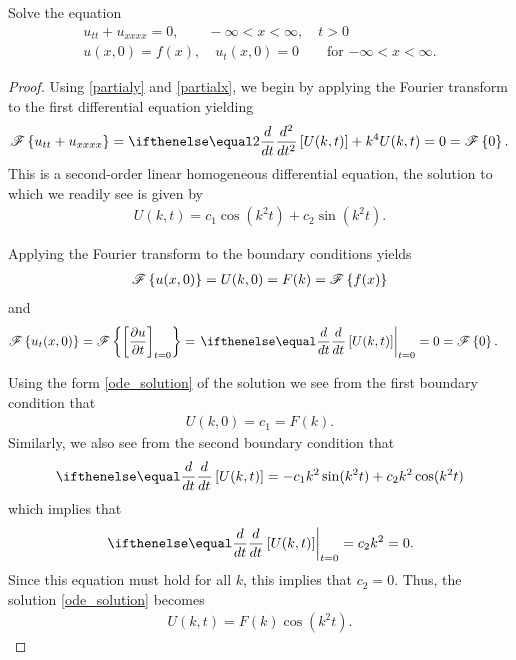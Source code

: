 \begin{problem}{2.12}
  Solve the equation
  \begin{align*}
    u_{tt} + u_{xxxx} = 0, \qquad -\infty < x < \infty, \quad t > 0 \\
    u(x, 0) = f(x),\quad u_t(x, 0) = 0 \qquad \text{for $-\infty < x < \infty$}.
  \end{align*}
\end{problem}

\begin{proof}
  Using \eqref{partialy} and \eqref{partialx}, we begin by applying the Fourier transform to the first differential equation yielding
  \begin{align*}
    \fourier{u_{tt} + u_{xxxx}} = \der{t}{2}\left[U(k, t)\right] + k^4 U(k, t) = 0 = \fourier{0}.
  \end{align*}
  This is a second-order linear homogeneous differential equation, the solution to which we readily see is given by
  \begin{align}\label{ode_solution}
    U(k, t) = c_1 \cos(k^2 t) + c_2 \sin(k^2 t).
  \end{align}

  Applying the Fourier transform to the boundary conditions yields
  \begin{align*}
    \mathscr{F}\left\{ {u(x, 0)} \right\} = U(k, 0) = F(k) = \mathscr{F}\left\{ {f(x)} \right\}
  \end{align*}
  and
  \begin{align*}
    \fourier{u_t(x, 0)} = \fourier{\left[\frac{\partial u}{\partial t}\right]_{t=0}} &= \left.\der{t}{}\left[U(k, t)\right]\right\rvert_{t=0} = 0 = \fourier{0}.
  \end{align*}

  Using the form \eqref{ode_solution} of the solution we see from the first boundary condition that
  \begin{align*}
    U(k, 0) = c_1 = F(k).
  \end{align*}
  Similarly, we also see from the second boundary condition that
  \begin{align*}
    \der{t}{}\left[U(k, t)\right] = -c_1 k^2 \sin(k^2 t) + c_2 k^2 \cos(k^2 t)
  \end{align*}
  which implies that
  \begin{align*}
    \left.\der{t}{}\left[U(k, t)\right]\right\rvert_{t=0} = c_2 k^2 = 0.
  \end{align*}
  Since this equation must hold for all $k$, this implies that $c_2 = 0$.
  Thus, the solution \eqref{ode_solution} becomes
  \begin{align*}
    U(k,t) = F(k)\cos(k^2t).
  \end{align*}


\end{proof}
